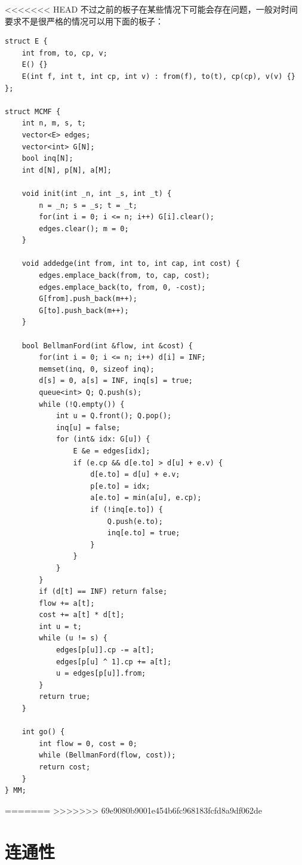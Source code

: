 \documentclass[a4paper,11pt,twoside,fontset = fandol,UTF8]{ctexbook} %
\begin{document}
<<<<<<< HEAD
	不过之前的板子在某些情况下可能会存在问题，一般对时间要求不是很严格的情况可以用下面的板子：
	\begin{lstlisting}
struct E {
    int from, to, cp, v;
    E() {}
    E(int f, int t, int cp, int v) : from(f), to(t), cp(cp), v(v) {}
};

struct MCMF {
    int n, m, s, t;
    vector<E> edges;
    vector<int> G[N];
    bool inq[N];
    int d[N], p[N], a[M];

    void init(int _n, int _s, int _t) {
        n = _n; s = _s; t = _t;
        for(int i = 0; i <= n; i++) G[i].clear();
        edges.clear(); m = 0;
    }

    void addedge(int from, int to, int cap, int cost) {
        edges.emplace_back(from, to, cap, cost);
        edges.emplace_back(to, from, 0, -cost);
        G[from].push_back(m++);
        G[to].push_back(m++);
    }

    bool BellmanFord(int &flow, int &cost) {
        for(int i = 0; i <= n; i++) d[i] = INF;
        memset(inq, 0, sizeof inq);
        d[s] = 0, a[s] = INF, inq[s] = true;
        queue<int> Q; Q.push(s);
        while (!Q.empty()) {
            int u = Q.front(); Q.pop();
            inq[u] = false;
            for (int& idx: G[u]) {
                E &e = edges[idx];
                if (e.cp && d[e.to] > d[u] + e.v) {
                    d[e.to] = d[u] + e.v;
                    p[e.to] = idx;
                    a[e.to] = min(a[u], e.cp);
                    if (!inq[e.to]) {
                        Q.push(e.to);
                        inq[e.to] = true;
                    }
                }
            }
        }
        if (d[t] == INF) return false;
        flow += a[t];
        cost += a[t] * d[t];
        int u = t;
        while (u != s) {
            edges[p[u]].cp -= a[t];
            edges[p[u] ^ 1].cp += a[t];
            u = edges[p[u]].from;
        }
        return true;
    }

    int go() {
        int flow = 0, cost = 0;
        while (BellmanFord(flow, cost));
        return cost;
    }
} MM;

	\end{lstlisting}
=======
>>>>>>> 69e9080b9001e454b6fc968183fcfd8a9df062de
	\section{连通性}
\end{document}
